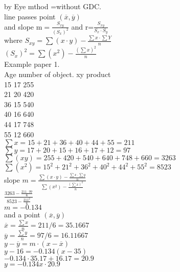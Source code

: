 \documentclass{article}
\begin{document}
  by Eye mthod =without GDC.\\
  line passes point $(\overline{x}, \overline{y})$\\
  and slope m$=\frac{S_{xy}}{(S_x)^2}$ and r=$\frac{S_{xy}}{S_x\cdot S_y}$\\
  where $S_{xy}=\sum (x\cdot y)-\frac{\sum x\cdot \sum Y}{n}$\\
  $(S_x)^2=\sum (x^2) - \frac{(\sum x)^2}{n}$\\
  Example paper 1.\\
  Age    number of object. xy product\\
  15    17      255\\
  21    20      420\\
  36    15      540\\
  40    16      640\\
  44    17      748\\
  55    12      660\\
  $\sum x=15+21+36+40+44+55=211$\\
  $\sum y=17+20+15+16+17+12=97$\\
  $\sum (xy)=255+420+540+640+748+660=3263$\\
  $\sum (x^2)=15^2+21^2+36^2+40^2+44^2+55^2=8523$\\
  slope $m=\frac{\sum (x\cdot y)-\frac{\sum x\cdot \sum y}{n}}{\sum (x^2)-\frac{(\sum x)^2}{n}}$\\
  $\frac{3263-\frac{211\cdot97}{6}}{8523-\frac{211^2}{6}}$\\
  $m=-0.134$\\
  and a point $(\overline{x}, \overline{y})$\\
  $\overline{x}=\frac{\sum x}{n}=211/6=35.1667$\\
  $\overline{y}=\frac{\sum y}{n}=97/6=16.11667$\\
  $y-\overline{y}=m\cdot (x-\overline{x})$\\
  $y-16=-0.134(x-35)$\\
  $-0.134\cdot35.17+16.17=20.9$\\
  $y=-0.134x\cdot 20.9$\\
\end{document}
